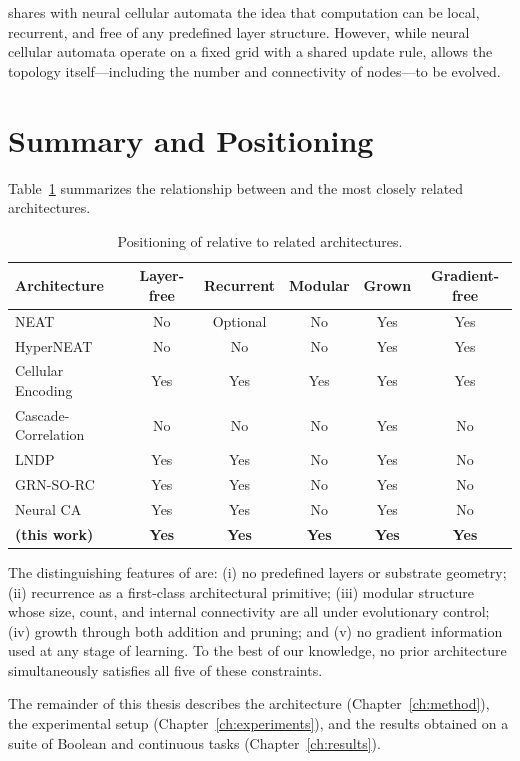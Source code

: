 \modnet{} shares with neural cellular automata the idea that computation
can be local, recurrent, and free of any predefined layer structure. However,
while neural cellular automata operate on a fixed grid with a shared update
rule, \modnet{} allows the topology itself—including the number and
connectivity of nodes—to be evolved.

\section{Summary and Positioning}
\label{sec:positioning}

Table~\ref{tab:positioning} summarizes the relationship between \modnet{}
and the most closely related architectures.

\begin{table}[h]
  \centering
  \small
  \caption{Positioning of \modnet{} relative to related architectures.}
  \label{tab:positioning}
  \begin{tabular}{lccccc}
    \toprule
    \textbf{Architecture} & \textbf{Layer-free} & \textbf{Recurrent}
      & \textbf{Modular} & \textbf{Grown} & \textbf{Gradient-free} \\
    \midrule
    NEAT \citep{stanley2002evolving} & No & Optional & No & Yes & Yes \\
    HyperNEAT \citep{stanley2009hypercube} & No & No & No & Yes & Yes \\
    Cellular Encoding \citep{gruau1994neural} & Yes & Yes & Yes & Yes & Yes \\
    Cascade-Correlation \citep{fahlman1990cascade} & No & No & No & Yes & No \\
    LNDP \citep{plantec2024evolving} & Yes & Yes & No & Yes & No \\
    GRN-SO-RC \citep{hajizada2024developmental} & Yes & Yes & No & Yes & No \\
    Neural CA \citep{mordvintsev2020growing} & Yes & Yes & No & Yes & No \\
    \textbf{\modnet{} (this work)} & \textbf{Yes} & \textbf{Yes}
      & \textbf{Yes} & \textbf{Yes} & \textbf{Yes} \\
    \bottomrule
  \end{tabular}
\end{table}

The distinguishing features of \modnet{} are: (i) no predefined layers or
substrate geometry; (ii) recurrence as a first-class architectural primitive;
(iii) modular structure whose size, count, and internal connectivity are all
under evolutionary control; (iv) growth through both addition and pruning;
and (v) no gradient information used at any stage of learning. To the best of
our knowledge, no prior architecture simultaneously satisfies all five of
these constraints.

The remainder of this thesis describes the \modnet{} architecture
(Chapter~\ref{ch:method}), the experimental setup (Chapter~\ref{ch:experiments}),
and the results obtained on a suite of Boolean and continuous tasks
(Chapter~\ref{ch:results}).